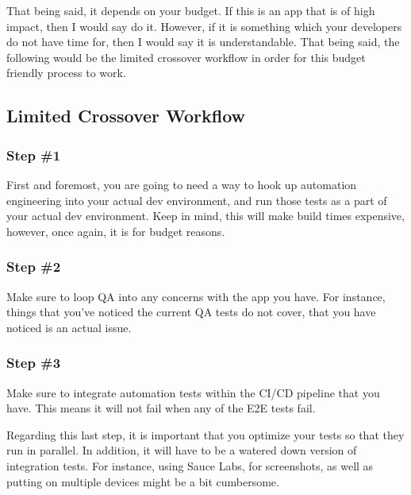 That being said, it depends on your budget. If this is an app that is of high
impact, then I would say do it. However, if it is something which your developers
do not have time for, then I would say it is understandable. That being said,
the following would be the limited crossover workflow in order for this budget
friendly process to work.

\subsection{Limited Crossover Workflow}
\subsubsection{Step \#1}

First and foremost, you are going to need a way to hook up automation engineering
into your actual dev environment, and run those tests as a part of your actual
dev environment. Keep in mind, this will make build times expensive, however,
once again, it is for budget reasons.

\subsubsection{Step \#2}
Make sure to loop QA into any concerns with the app you have. For instance,
things that you've noticed the current QA tests do not cover, that you have
noticed is an actual issue.

\subsubsection{Step \#3}
Make sure to integrate automation tests within the CI/CD pipeline that you have.
This means it will not fail when any of the E2E tests fail.

Regarding this last step, it is important that you optimize your tests so
that they run in parallel. In addition, it will have to be a watered down
version of integration tests. For instance, using Sauce Labs, for screenshots,
as well as putting on multiple devices might be a bit cumbersome.
